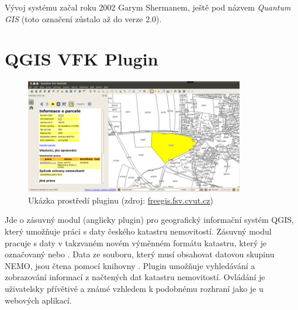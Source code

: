 Vývoj systému začal roku 2002 Garym Shermanem, ještě pod názvem
\textit {Quantum GIS} (toto označení zůstalo až do verze 2.0).\cite{qgis_official, qgis_wiki_en, qgis_wiki_cz}
 
\section{QGIS VFK Plugin}
\label{sec:qgis_plugin}
\begin{figure}[H]
	 \centering
      \includegraphics[height=5cm]{./pictures/Qgisvfkplugin.png}
      \caption{Ukázka prostředí pluginu (zdroj:
\href{http://freegis.fsv.cvut.cz/wiki/images/4/4b/Qgisvfkplugin-screenshot-05.png}{freegis.fsv.cvut.cz})}
      \label{fig:qgis_vfk_plugin}
  \end{figure}

Jde o zásuvný modul (anglicky plugin) pro geografický informační systém
QGIS, který umožňuje práci s daty českého katastru
nemovitostí. Zásuvný modul pracuje s daty v takzvaném novém
výměnném formátu katastru, který je označovaný  nebo
. Data ze souboru, který musí obsahovat datovou skupinu NEMO, jsou čtena pomocí knihovny . Plugin
umožňuje vyhledávání a zobrazování informací z načtených dat katastru
nemovitostí. Ovládání je uživatelsky přívětivé a známé vzhledem k
podobnému rozhraní jako je u webových aplikací.


